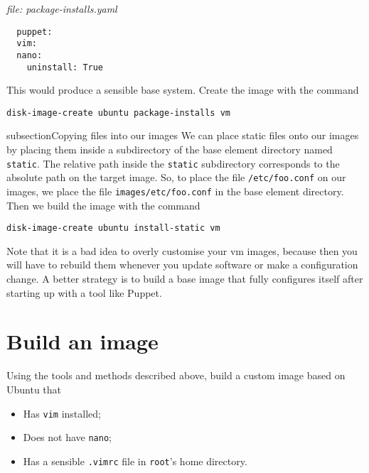 \documentclass{article}
\begin{document}
\emph{file: package-installs.yaml}
\begin{verbatim}
  puppet:
  vim:
  nano:
    uninstall: True
\end{verbatim}

This would produce a sensible base system. Create the image with the command

\texttt{disk-image-create ubuntu package-installs vm}


subsection{Copying files into our images}
We can place static files onto our images by placing them inside a subdirectory of the base element directory named \texttt{static}.  The relative path inside the \texttt{static} subdirectory corresponds to the absolute path on the target image. So, to place the file \texttt{/etc/foo.conf} on our images, we place the file \texttt{images/etc/foo.conf} in the base element directory. Then we build the image with the command

\texttt{disk-image-create ubuntu install-static vm}

Note that it is a bad idea to overly customise your vm images, because then you will have to rebuild them whenever you update software or make a configuration change.  A better strategy is to build a base image that fully configures itself after starting up with a tool like Puppet.

\section{Build an image}
Using the tools and methods described above, build a custom image based on Ubuntu that

\begin{itemize}
	\item Has \texttt{vim} installed;
	\item Does not have \texttt{nano};
	\item Has a sensible \texttt{.vimrc} file in \texttt{root}'s home directory.
\end{itemize}
\end{document}
